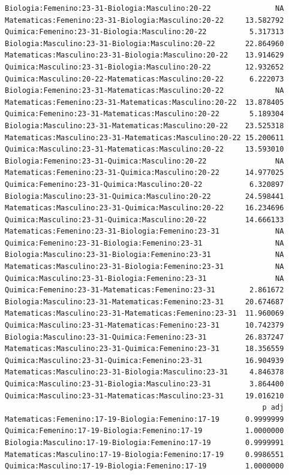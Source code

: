 \documentclass{rapport}
\begin{document}
\begin{itemize}
\begin{verbatim}
Biologia:Femenino:23-31-Biologia:Masculino:20-22               NA
Matematicas:Femenino:23-31-Biologia:Masculino:20-22     13.582792
Quimica:Femenino:23-31-Biologia:Masculino:20-22          5.317313
Biologia:Masculino:23-31-Biologia:Masculino:20-22       22.864960
Matematicas:Masculino:23-31-Biologia:Masculino:20-22    13.914629
Quimica:Masculino:23-31-Biologia:Masculino:20-22        12.932652
Quimica:Masculino:20-22-Matematicas:Masculino:20-22      6.222073
Biologia:Femenino:23-31-Matematicas:Masculino:20-22            NA
Matematicas:Femenino:23-31-Matematicas:Masculino:20-22  13.878405
Quimica:Femenino:23-31-Matematicas:Masculino:20-22       5.189304
Biologia:Masculino:23-31-Matematicas:Masculino:20-22    23.525318
Matematicas:Masculino:23-31-Matematicas:Masculino:20-22 15.200611
Quimica:Masculino:23-31-Matematicas:Masculino:20-22     13.593010
Biologia:Femenino:23-31-Quimica:Masculino:20-22                NA
Matematicas:Femenino:23-31-Quimica:Masculino:20-22      14.977025
Quimica:Femenino:23-31-Quimica:Masculino:20-22           6.320897
Biologia:Masculino:23-31-Quimica:Masculino:20-22        24.598441
Matematicas:Masculino:23-31-Quimica:Masculino:20-22     16.234696
Quimica:Masculino:23-31-Quimica:Masculino:20-22         14.666133
Matematicas:Femenino:23-31-Biologia:Femenino:23-31             NA
Quimica:Femenino:23-31-Biologia:Femenino:23-31                 NA
Biologia:Masculino:23-31-Biologia:Femenino:23-31               NA
Matematicas:Masculino:23-31-Biologia:Femenino:23-31            NA
Quimica:Masculino:23-31-Biologia:Femenino:23-31                NA
Quimica:Femenino:23-31-Matematicas:Femenino:23-31        2.861672
Biologia:Masculino:23-31-Matematicas:Femenino:23-31     20.674687
Matematicas:Masculino:23-31-Matematicas:Femenino:23-31  11.960069
Quimica:Masculino:23-31-Matematicas:Femenino:23-31      10.742379
Biologia:Masculino:23-31-Quimica:Femenino:23-31         26.837247
Matematicas:Masculino:23-31-Quimica:Femenino:23-31      18.356559
Quimica:Masculino:23-31-Quimica:Femenino:23-31          16.904939
Matematicas:Masculino:23-31-Biologia:Masculino:23-31     4.846378
Quimica:Masculino:23-31-Biologia:Masculino:23-31         3.864400
Quimica:Masculino:23-31-Matematicas:Masculino:23-31     19.016210
                                                            p adj
Matematicas:Femenino:17-19-Biologia:Femenino:17-19      0.9999999
Quimica:Femenino:17-19-Biologia:Femenino:17-19          1.0000000
Biologia:Masculino:17-19-Biologia:Femenino:17-19        0.9999991
Matematicas:Masculino:17-19-Biologia:Femenino:17-19     0.9986551
Quimica:Masculino:17-19-Biologia:Femenino:17-19         1.0000000

\end{verbatim}
\end{itemize}
\end{document}

